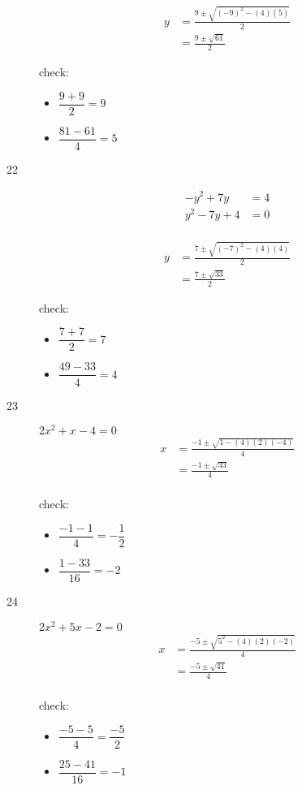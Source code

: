 \documentclass[fleqn,addpoints]{exam}
\begin{document}
\begin{description}
\begin{align*}
  y &= \frac{9 \pm \sqrt{(-9)^2 - (4)(5)}}{2} \\
    &= \frac{9 \pm \sqrt{61}}{2}
\end{align*}

check:
\begin{itemize}
  \item \( \dfrac{9 + 9}{2} = 9\)
  \item \( \dfrac{81-61}{4} = 5 \)
\end{itemize}

\item[22] \(  \)
\begin{align*}
  -y^2 + 7y &= 4 \\
  y^2 - 7y + 4 &= 0 \\
\end{align*}

\begin{align*}
  y &= \frac{7 \pm \sqrt{(-7)^2 - (4)(4)}}{2} \\
  &= \frac{7 \pm \sqrt{33}}{2}
\end{align*}

check:
\begin{itemize}
  \item \( \dfrac{7 + 7}{2} = 7 \)
  \item \( \dfrac{49-33}{4} = 4 \)
\end{itemize}

\item[23] \( 2x^2+x-4=0 \)
\begin{align*}
  x &= \frac{-1 \pm \sqrt{1 - (4)(2)(-4)}}{4} \\
  &= \frac{-1 \pm \sqrt{33}}{4} \\
\end{align*}

check:
\begin{itemize}
  \item \( \dfrac{-1 - 1}{4} = - \dfrac{1}{2} \)
  \item \( \dfrac{1 - 33}{16} = -2 \)
\end{itemize}

\item[24] \( 2x^2 + 5x - 2 = 0 \)
\begin{align*}
  x &= \frac{-5 \pm \sqrt{5^2 - (4)(2)(-2)}}{4} \\
  &= \frac{-5 \pm \sqrt{41}}{4} \\
\end{align*}

check:
\begin{itemize}
  \item \( \dfrac{-5-5}{4} = \dfrac{-5}{2} \)
  \item \( \dfrac{25-41}{16} = -1 \)
\end{itemize}


\end{description}
\end{document}
